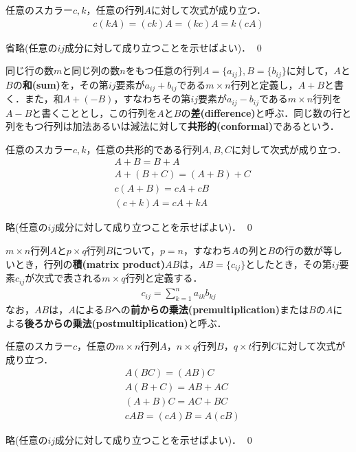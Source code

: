 \begin{theo}
任意のスカラー$c,k$，任意の行列$A$に対して次式が成り立つ．
\begin{align}
c(kA)=(ck)A=(kc)A=k(cA)	
\end{align}
\end{theo}
\begin{pro}
省略(任意の$ij$成分に対して成り立つことを示せばよい)．	\qed
\end{pro}

\begin{defi}[行列の加法と減法]
同じ行の数$m$と同じ列の数$n$をもつ任意の行列$A=\{a_{ij}\},B=\{b_{ij}\}$に対して，$A$と$B$の{\bf 和(sum)}を，その第$ij$要素が$a_{ij}+b_{ij}$である$m\times n$行列と定義し，$A+B$と書く．また，和$A+(-B)$，すなわちその第$ij$要素が$a_{ij}-b_{ij}$である$m\times n$行列を$A-B$と書くこととし，この行列を$A$と$B$の{\bf 差(difference)}と呼ぶ．同じ数の行と列をもつ行列は加法あるいは減法に対して{\bf 共形的(conformal)}であるという．
\end{defi}

\begin{theo}
任意のスカラー$c,k$，任意の共形的である行列$A,B,C$に対して次式が成り立つ．
\begin{align}
&A+B=B+A \label{koukan}\\
& A+(B+C)=(A+B)+C \\
& c(A+B)=cA+cB \\
& (c+k)A=cA+kA
\end{align}
\end{theo}
\begin{pro}
略(任意の$ij$成分に対して成り立つことを示せばよい)．	\qed
\end{pro}

\begin{defi}[行列の積]
$m\times n$行列$A$と$p\times q$行列$B$について，$p=n$，すなわち$A$の列と$B$の行の数が等しいとき，行列の{\bf 積(matrix product)}$AB$は，$AB=\{c_{ij}\}$としたとき，その第$ij$要素$c_{ij}$が次式で表される$m\times q$行列と定義する．
\begin{align}
c_{ij}=\sum_{k=1}^n a_{ik}b_{kj}	 \label{prod}
\end{align}
なお，$AB$は，$A$による$B$への{\bf 前からの乗法(premultiplication)}または$B$の$A$による{\bf 後ろからの乗法(postmultiplication)}と呼ぶ．
\end{defi}

\begin{theo}
任意のスカラー$c$，任意の$m\times n$行列$A$，$n\times q$行列$B$，$q\times t$行列$C$に対して次式が成り立つ．
\begin{align}
&A(BC)=(AB)C \\
&A(B+C)=AB+AC \label{bun1}\\
&(A+B)C=AC+BC \label{bun2}\\
&cAB=(cA)B=A(cB)
\end{align}
\end{theo}
\begin{pro}
略(任意の$ij$成分に対して成り立つことを示せばよい)．	\qed
\end{pro}

